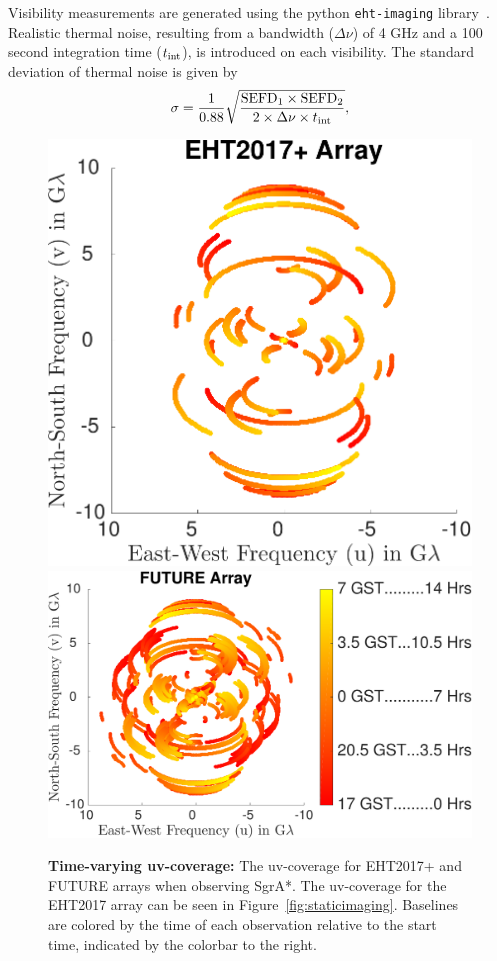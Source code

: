 Visibility measurements are generated using the python \texttt{eht-imaging} library~\cite{andrew}. %
Realistic thermal noise, resulting from a bandwidth ($\Delta \nu$) of 4 GHz and a 100 second integration time ($t_{\rm int}$), is introduced on each visibility. The standard deviation of thermal noise is given by
\begin{align}
\sigma = \frac{1}{0.88} \sqrt{\frac{\mbox{SEFD}_1 \times \mbox{SEFD}_2 }{2 \times \Delta \nu \times t_{\rm int} } },
\label{eq:thermal}
\end{align}

\noindent{for System Equivalent Flux Density (SEFD) of the two telescopes corresponding to each visibility\footnote{The factor of 1/0.88 is due to information loss due to recording 2-bit quantized data-streams at each telescope~\cite{TMS}.}~\cite{taylor1999synthesis}.  %
Random station-based atmospheric phases drawn from a uniform distribution at each time step are introduced into measurements using the \texttt{eht-imaging} library. 
In Videos 2-4 a set of measurements is sampled every 5 minutes over a roughly 14 hour duration, resulting in 173 time steps. In Video 1 only 30 time steps are measured over a 12 hour duration. 
}


\begin{figure}[h!]
	\centering
	{\includegraphics[height=.38\linewidth]{figures/uvcoverage/uv_ehtfuture2_2.pdf}}
	{\includegraphics[height=.38\linewidth]{figures/uvcoverage/uv_ehtfuture1_2.pdf}}
	\caption{{\bf Time-varying uv-coverage:} The uv-coverage for EHT2017+ and FUTURE arrays when observing SgrA*. The uv-coverage for the EHT2017 array can be seen in Figure~\ref{fig:staticimaging}. 
		Baselines are colored by the time of each observation relative to the start time, indicated by the colorbar to the right.}
	\label{fig:uvcov2}

\end{figure}


